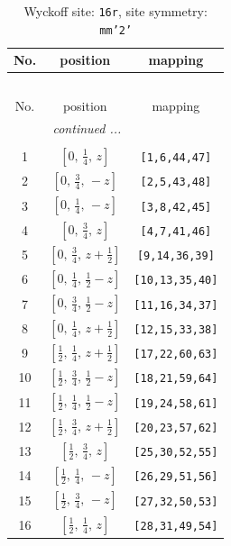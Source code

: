 \documentclass[fleqn,8pt]{jsarticle}
\begin{document}
\renewcommand{\arraystretch}{1.2}
\begin{longtable}{ccc}
\caption{Wyckoff site: {\tt 16r}, site symmetry: {\tt mm'2'}}
 \\
 \hline \hline
No. & position & mapping \\ \hline \endfirsthead

\multicolumn{2}{l}{\tablename\ \thetable{}} \\
 \hline \hline
No. & position & mapping \\ \hline \endhead

 \hline \hline
\multicolumn{2}{r}{\footnotesize\it continued ...} \\ \endfoot

 \hline \hline
\multicolumn{2}{r}{} \\ \endlastfoot

1 & $\left[ 0,\, \frac{1}{4},\, z \right]$ & {\tt [1,6,44,47]} \\ \hline
2 & $\left[ 0,\, \frac{3}{4},\, - z \right]$ & {\tt [2,5,43,48]} \\ \hline
3 & $\left[ 0,\, \frac{1}{4},\, - z \right]$ & {\tt [3,8,42,45]} \\ \hline
4 & $\left[ 0,\, \frac{3}{4},\, z \right]$ & {\tt [4,7,41,46]} \\ \hline
5 & $\left[ 0,\, \frac{3}{4},\, z + \frac{1}{2} \right]$ & {\tt [9,14,36,39]} \\ \hline
6 & $\left[ 0,\, \frac{1}{4},\, \frac{1}{2} - z \right]$ & {\tt [10,13,35,40]} \\ \hline
7 & $\left[ 0,\, \frac{3}{4},\, \frac{1}{2} - z \right]$ & {\tt [11,16,34,37]} \\ \hline
8 & $\left[ 0,\, \frac{1}{4},\, z + \frac{1}{2} \right]$ & {\tt [12,15,33,38]} \\ \hline
9 & $\left[ \frac{1}{2},\, \frac{1}{4},\, z + \frac{1}{2} \right]$ & {\tt [17,22,60,63]} \\ \hline
10 & $\left[ \frac{1}{2},\, \frac{3}{4},\, \frac{1}{2} - z \right]$ & {\tt [18,21,59,64]} \\ \hline
11 & $\left[ \frac{1}{2},\, \frac{1}{4},\, \frac{1}{2} - z \right]$ & {\tt [19,24,58,61]} \\ \hline
12 & $\left[ \frac{1}{2},\, \frac{3}{4},\, z + \frac{1}{2} \right]$ & {\tt [20,23,57,62]} \\ \hline
13 & $\left[ \frac{1}{2},\, \frac{3}{4},\, z \right]$ & {\tt [25,30,52,55]} \\ \hline
14 & $\left[ \frac{1}{2},\, \frac{1}{4},\, - z \right]$ & {\tt [26,29,51,56]} \\ \hline
15 & $\left[ \frac{1}{2},\, \frac{3}{4},\, - z \right]$ & {\tt [27,32,50,53]} \\ \hline
16 & $\left[ \frac{1}{2},\, \frac{1}{4},\, z \right]$ & {\tt [28,31,49,54]} \\
\end{longtable}
\end{document}
